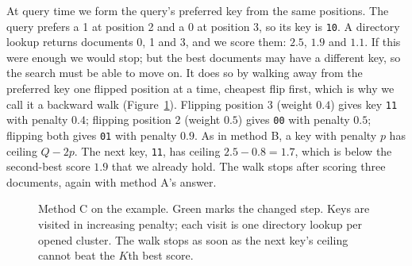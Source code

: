 At query time we form the query's preferred key from the same positions. The query prefers
a 1 at position 2 and a 0 at position 3, so its key is \texttt{10}. A directory lookup returns
documents 0, 1 and 3, and we score them: $2.5$, $1.9$ and $1.1$. If this were enough we would
stop; but the best documents may have a different key, so the search must be able to move on.
It does so by walking away from the preferred key one flipped position at a time, cheapest
flip first, which is why we call it a backward walk (Figure~\ref{fig:key-walk}). Flipping
position 3 (weight $0.4$) gives key \texttt{11} with penalty $0.4$; flipping position 2
(weight $0.5$) gives \texttt{00} with penalty $0.5$; flipping both gives \texttt{01} with
penalty $0.9$. As in method B, a key with penalty $p$ has ceiling $Q-2p$. The next key,
\texttt{11}, has ceiling $2.5-0.8=1.7$, which is below the second-best score $1.9$ that we
already hold. The walk stops after scoring three documents, again with method A's answer.

\begin{figure}[H]\centering
{}
\caption{Method C on the example. Green marks the changed step. Keys are visited in
increasing penalty; each visit is one directory lookup per opened cluster. The walk stops as
soon as the next key's ceiling cannot beat the $K$th best score.}
\label{fig:key-walk}
\end{figure}

